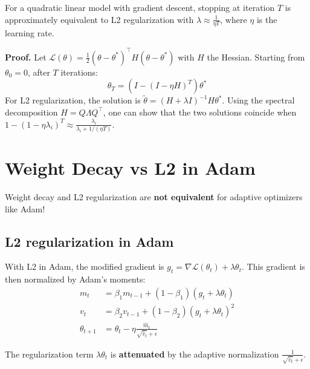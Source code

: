 \begin{theorem}
For a quadratic linear model with gradient descent, stopping at
iteration $T$ is approximately equivalent to L2 regularization with
$\lambda \approx \frac{1}{\eta T}$, where $\eta$ is the learning rate.

\textbf{Proof.} Let $\mathcal{L}(\theta) = \frac{1}{2}(\theta - \theta^*)^\top H (\theta - \theta^*)$
with $H$ the Hessian. Starting from $\theta_0 = 0$, after $T$ iterations:
\begin{equation}
\theta_T = (I - (I - \eta H)^T) \theta^*
\end{equation}
For L2 regularization, the solution is
$\tilde{\theta} = (H + \lambda I)^{-1} H \theta^*$.
Using the spectral decomposition $H = Q \Lambda Q^\top$, one can show
that the two solutions coincide when
$1 - (1 - \eta \lambda_i)^T \approx \frac{\lambda_i}{\lambda_i + 1/(\eta T)}$.
\end{theorem}

\section{Weight Decay vs L2 in Adam}
\label{sec:weight-decay-adam}

\begin{warning}[title=\textbf{Crucial difference}]
Weight decay and L2 regularization are \textbf{not equivalent} for
adaptive optimizers like Adam!
\end{warning}

\subsection{L2 regularization in Adam}

With L2 in Adam, the modified gradient is $g_t = \nabla \mathcal{L}(\theta_t) + \lambda \theta_t$.
This gradient is then normalized by Adam's moments:
\begin{align}
m_t &= \beta_1 m_{t-1} + (1 - \beta_1)(g_t + \lambda \theta_t) \\
v_t &= \beta_2 v_{t-1} + (1 - \beta_2)(g_t + \lambda \theta_t)^2 \\
\theta_{t+1} &= \theta_t - \eta \frac{\hat{m}_t}{\sqrt{\hat{v}_t} + \epsilon}
\end{align}

The regularization term $\lambda \theta_t$ is \textbf{attenuated} by
the adaptive normalization $\frac{1}{\sqrt{\hat{v}_t} + \epsilon}$.


